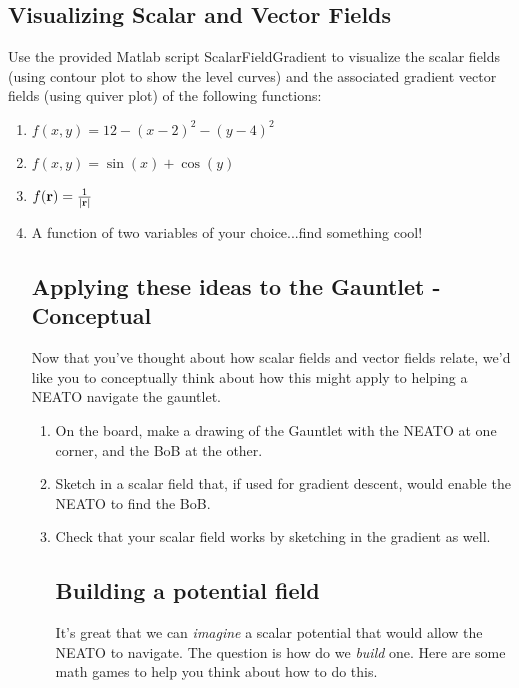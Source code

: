 \documentclass{tufte-handout}
\begin{document}
\begin{enumerate}[series=exercises, label=\textbf{Exercise} (\arabic*)]
\subsection{Visualizing Scalar and Vector Fields}
Use the provided Matlab script ScalarFieldGradient to visualize the scalar fields (using contour plot to show the level curves) and the associated gradient vector fields (using quiver plot) of the following functions:
\begin{enumerate}[resume=exercises, label=\textbf{Exercise} (\arabic*)]
\item  $f(x,y) = 12-(x-2)^2 -(y-4)^2$
\item  $f(x,y) = \sin(x) + \cos(y)$
\item  $f(\mathbf{r}) = \frac{1}{|\mathbf{r}|}$
\item  A function of two variables of your choice...find something cool!
\ee

\subsection{Applying these ideas to the Gauntlet - Conceptual}
Now that you've thought about how scalar fields and vector fields relate, we'd like you to conceptually think about how this might apply to helping a NEATO navigate the gauntlet.  
\begin{enumerate}[resume=exercises, label=\textbf{Exercise} (\arabic*)]
\item On the board, make a drawing of the Gauntlet with the NEATO at one corner, and the BoB at the other.  
\item Sketch in a scalar field that, if used for gradient descent, would enable the NEATO to find the BoB.   
\item Check that your scalar field works by sketching in the gradient as well.
\ee

\subsection{Building a potential field}
It's great that we can {\it imagine} a scalar potential that would allow the NEATO to navigate.  The question is how do we {\it build} one.  Here are some math games to help you think about how to do this.


\end{enumerate}
\end{enumerate}
\end{enumerate}
\end{document}
